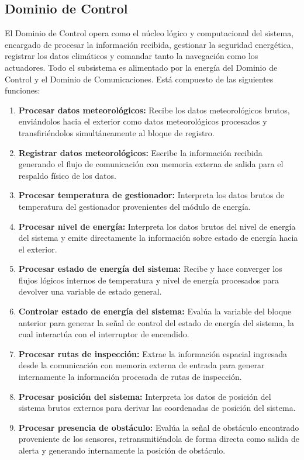 \subsection{Dominio de Control}

El Dominio de Control opera como el núcleo lógico y computacional del sistema, encargado de procesar la información recibida, gestionar la seguridad energética, registrar los datos climáticos y comandar tanto la navegación como los actuadores. Todo el subsistema es alimentado por la energía del Dominio de Control y el Dominio de Comunicaciones. Está compuesto de las siguientes funciones:

\begin{enumerate}
	\item \textbf{Procesar datos meteorológicos:} Recibe los datos meteorológicos brutos, enviándolos hacia el exterior como datos meteorológicos procesados y transfiriéndolos simultáneamente al bloque de registro.
	\item \textbf{Registrar datos meteorológicos:} Escribe la información recibida generando el flujo de comunicación con memoria externa de salida para el respaldo físico de los datos.
	\item \textbf{Procesar temperatura de gestionador:} Interpreta los datos brutos de temperatura del gestionador provenientes del módulo de energía.
	\item \textbf{Procesar nivel de energía:} Interpreta los datos brutos del nivel de energía del sistema y emite directamente la información sobre estado de energía hacia el exterior.
	\item \textbf{Procesar estado de energía del sistema:} Recibe y hace converger los flujos lógicos internos de temperatura y nivel de energía procesados para devolver una variable de estado general.
	\item \textbf{Controlar estado de energía del sistema:} Evalúa la variable del bloque anterior para generar la señal de control del estado de energía del sistema, la cual interactúa con el interruptor de encendido.
	\item \textbf{Procesar rutas de inspección:} Extrae la información espacial ingresada desde la comunicación con memoria externa de entrada para generar internamente la información procesada de rutas de inspección.
	\item \textbf{Procesar posición del sistema:} Interpreta los datos de posición del sistema brutos externos para derivar las coordenadas de posición del sistema.
	\item \textbf{Procesar presencia de obstáculo:} Evalúa la señal de obstáculo encontrado proveniente de los sensores, retransmitiéndola de forma directa como salida de alerta y generando internamente la posición de obstáculo.

\end{enumerate}
